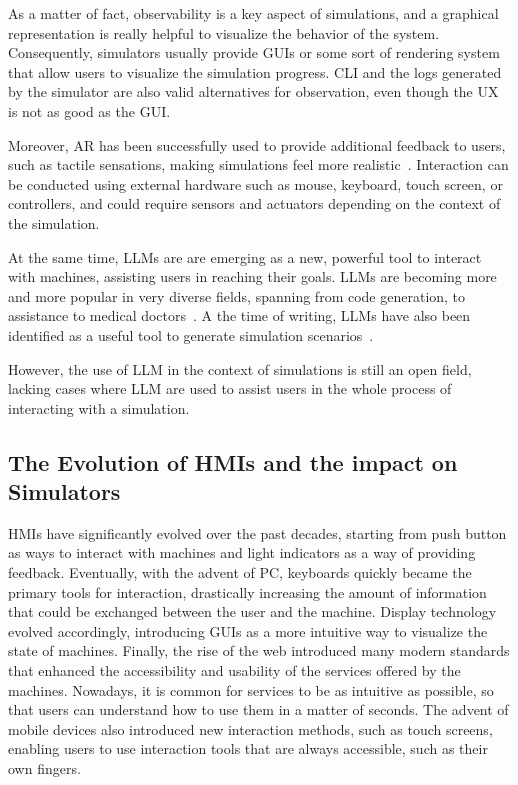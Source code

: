 \documentclass[conference]{IEEEtran}
\begin{document}
As a matter of fact,
observability is a key aspect of simulations,
and a graphical representation is really helpful to visualize the behavior of the system.
%
Consequently,
simulators usually provide \acp{GUI} or some sort of rendering system that allow users to visualize the simulation progress.
%
\ac{CLI} and the logs generated by the simulator are also valid alternatives for observation,
even though the \ac{UX} is not as good as the \ac{GUI}.

Moreover,
\ac{AR} has been successfully used to provide additional feedback to users,
such as tactile sensations,
making simulations feel more realistic~\cite{Jud2020}.
%
Interaction can be conducted using external hardware such as mouse, keyboard, touch screen, or controllers,
and could require sensors and actuators depending on the context of the simulation.

At the same time,
\ac{LLM}s are are emerging as a new, powerful tool to interact with machines,
assisting users in reaching their goals.
%
\acp{LLM} are becoming more and more popular in very diverse fields,
spanning from code generation,
to assistance to medical doctors~\cite{Wu2024}.
%
A the time of writing,
\acp{LLM} have also been identified as a useful tool to generate simulation scenarios~\cite{Zhang2023}.

However,
the use of \ac{LLM} in the context of simulations is still an open field,
lacking cases where \ac{LLM} are used to assist users in the whole process of interacting with a simulation.

\subsection{The Evolution of \acp{HMI} and the impact on Simulators}

\acp{HMI} have significantly evolved over the past decades,
starting from push button as ways to interact with machines and light indicators as a way of providing feedback.
%
Eventually,
with the advent of \ac{PC},
keyboards quickly became the primary tools for interaction,
drastically increasing the amount of information that could be exchanged between the user and the machine.
%
Display technology evolved accordingly,
introducing \acp{GUI} as a more intuitive way to visualize the state of machines.
%
Finally,
the rise of the web introduced many modern standards that enhanced the accessibility and usability of the services offered by the machines.
%
Nowadays,
it is common for services to be as intuitive as possible,
so that users can understand how to use them in a matter of seconds.
%
The advent of mobile devices also introduced new interaction methods,
such as touch screens,
enabling users to use interaction tools that are always accessible,
such as their own fingers.
%
\end{document}
